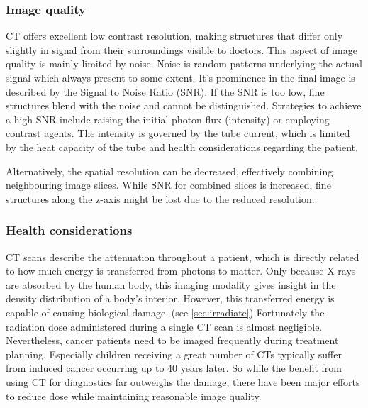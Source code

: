 \subsubsection{Image quality} %
CT offers excellent low contrast resolution, making structures that differ only slightly in signal from their surroundings visible to doctors.
This aspect of image quality is mainly limited by noise.
Noise is random patterns underlying the actual signal which always present to some extent.
It's prominence in the final image is described by the Signal to Noise Ratio (SNR).
If the SNR is too low, fine structures blend with the noise and cannot be distinguished. 
Strategies to achieve a high SNR include raising the initial photon flux (intensity) or employing contrast agents.
The intensity is governed by the tube current, which is limited by the heat capacity of the tube and health considerations regarding the patient.

Alternatively, the spatial resolution can be decreased, effectively combining neighbouring image slices.
While SNR for combined slices is increased, fine structures along the z-axis might be lost due to the reduced resolution. \cite{Podgorsak, Maidment2014}

\subsubsection{Health considerations}
CT scans describe the attenuation throughout a patient, which is directly related to how much energy is transferred from photons to matter.
Only because X-rays are absorbed by the human body, this imaging modality gives insight in the density distribution of a body's interior.
However, this transferred energy is capable of causing biological damage. (see \ref{sec:irradiate})
Fortunately the radiation dose administered during a single CT scan is almost negligible.
Nevertheless, cancer patients need to be imaged frequently during treatment planning.
Especially children receiving a great number of CTs typically suffer from induced cancer occurring up to 40 years later.
So while the benefit from using CT for diagnostics far outweighs the damage, there have been major efforts to reduce dose while maintaining reasonable image quality.
\cite{Murphy2007, Brenner2001, Sodickson2009, Smith2007, McCollough2009, Goldman2013}


